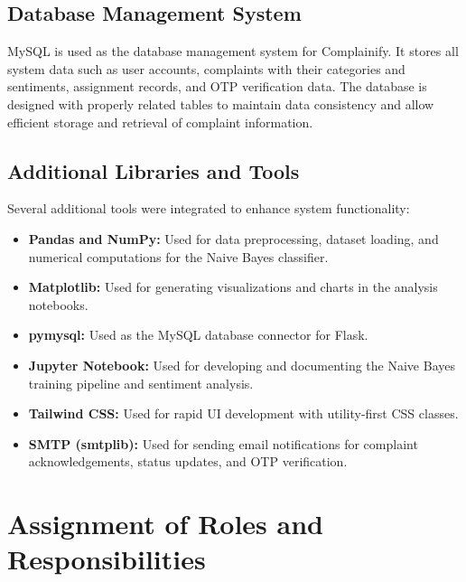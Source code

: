 \documentclass[12pt,a4paper]{report}
\begin{document}
\subsection{Database Management System}
MySQL is used as the database management system for Complainify. It stores all system data such as user accounts, complaints with their categories and sentiments, assignment records, and OTP verification data. The database is designed with properly related tables to maintain data consistency and allow efficient storage and retrieval of complaint information.

\subsection{Additional Libraries and Tools}
Several additional tools were integrated to enhance system functionality:
\begin{itemize}[nolistsep]
    \item \textbf{Pandas and NumPy:} Used for data preprocessing, dataset loading, and numerical computations for the Naive Bayes classifier.
    \item \textbf{Matplotlib:} Used for generating visualizations and charts in the analysis notebooks.
    \item \textbf{pymysql:} Used as the MySQL database connector for Flask.
    \item \textbf{Jupyter Notebook:} Used for developing and documenting the Naive Bayes training pipeline and sentiment analysis.
    \item \textbf{Tailwind CSS:} Used for rapid UI development with utility-first CSS classes.
    \item \textbf{SMTP (smtplib):} Used for sending email notifications for complaint acknowledgements, status updates, and OTP verification.
\end{itemize}

\section{Assignment of Roles and Responsibilities}
\end{document}
